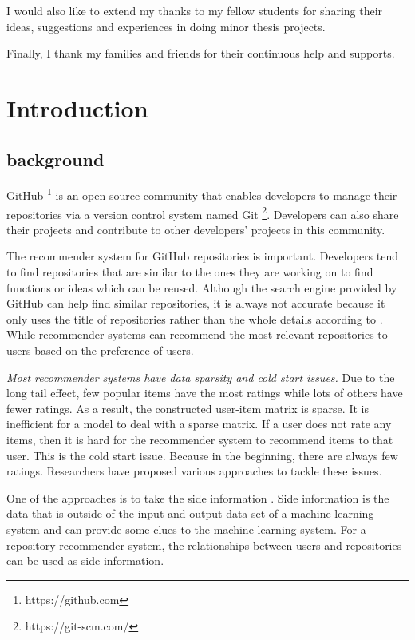 \documentclass[11pt,twoside]{report}
\begin{document}
I would also like to extend my thanks to my fellow students for sharing their ideas, suggestions and experiences in doing minor thesis projects.

Finally, I thank my families and friends for their continuous help and supports.

{
    \hypersetup{linkcolor=black}
    \tableofcontents
    \listoffigures
    \listoftables
}


\chapter{Introduction}
\section{background}
GitHub \footnote{https://github.com} is an open-source community that enables developers to manage their repositories via a version control system named Git \footnote{https://git-scm.com/}. Developers can also share their projects and contribute to other developers’ projects in this community.

The recommender system for GitHub repositories is important. Developers tend to find repositories that are similar to the ones they are working on to find functions or ideas which can be reused. Although the search engine provided by GitHub can help find similar repositories, it is always not accurate because it only uses the title of repositories rather than the whole details according to \cite{xu_repersp_2017}. While recommender systems can recommend the most relevant repositories to users based on the preference of users.

\textit{Most recommender systems have data sparsity and cold start issues.} Due to the long tail effect, few popular items have the most ratings while lots of others have fewer ratings. As a result, the constructed user-item matrix is sparse. It is inefficient for a model to deal with a sparse matrix. If a user does not rate any items, then it is hard for the recommender system to recommend items to that user. This is the cold start issue. Because in the beginning, there are always few ratings. Researchers have proposed various approaches to tackle these issues.

One of the approaches is to take the side information \cite{jonschkowski_patterns_2016}. Side information is the data that is outside of the input and output data set of a machine learning system and can provide some clues to the machine learning system. For a repository recommender system, the relationships between users and repositories can be used as side information.
\end{document}
